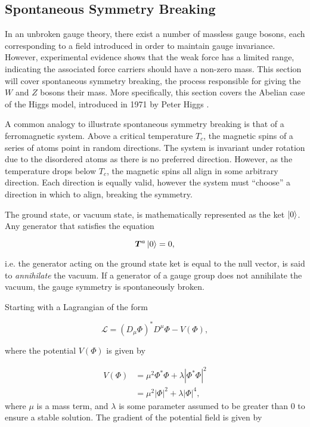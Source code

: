 \documentclass{article}
\begin{document}
\subsection{Spontaneous Symmetry Breaking}%
\label{sec:SM_SSB}

In an unbroken gauge theory, there exist a number of massless gauge bosons, each corresponding to a field introduced in order to maintain gauge invariance. However, experimental evidence shows that the weak force has a limited range, indicating the associated force carriers should have a non-zero mass. This section will cover spontaneous symmetry breaking, the process responsible for giving the $W$ and $Z$ bosons their mass. More specifically, this section covers the Abelian case of the Higgs model, introduced in 1971 by Peter Higgs \cite{HiggsMechanism}.

A common analogy to illustrate spontaneous symmetry breaking is that of a ferromagnetic system. Above a critical temperature $T_c$, the magnetic spins of a series of atoms point in random directions. The system is invariant under rotation due to the disordered atoms as there is no preferred direction. However, as the temperature drops below $T_c$, the magnetic spins all align in some arbitrary direction. Each direction is equally valid, however the system must ``choose'' a direction in which to align, breaking the symmetry.

The ground state, or vacuum state, is mathematically represented as the ket $\ket{0}$. Any generator that satisfies the equation

\begin{equation}
\bm{T}^a\ket{0} = 0,
\end{equation}

i.e. the generator acting on the ground state ket is equal to the null vector, is said to \textit{annihilate} the vacuum. If a generator of a gauge group does not annihilate the vacuum, the gauge symmetry is spontaneously broken.

Starting with a Lagrangian of the form

\begin{equation}
\label{eqn:ssbLagr}
\mathcal{L} = (D_\mu \Phi)^* D^\mu \Phi - V(\Phi),
\end{equation}

where the potential $V(\Phi)$ is given by

\begin{equation}
\begin{split}
V(\Phi) & = \mu^2 \Phi^*\Phi + \lambda|\Phi^*\Phi|^2 \\
& = \mu^2 |\Phi|^2 + \lambda|\Phi|^4,
\end{split}
\end{equation}
where $\mu$ is a mass term, and $\lambda$ is some parameter assumed to be greater than 0 to ensure a stable solution.
The gradient of the potential field is given by
\end{document}
